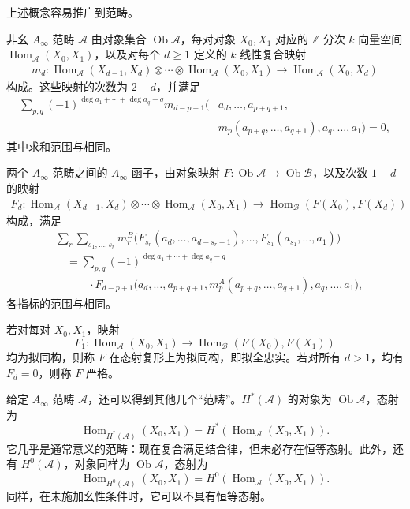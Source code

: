 上述概念容易推广到范畴。
\begin{definition}\label{def:8.6}
非幺 $A_\infty$ 范畴 $\mathcal A$ 由对象集合 $\operatorname{Ob}\mathcal A$，每对对象 $X_0,X_1$ 对应的 $\mathbb Z$ 分次 $k$ 向量空间 $\operatorname{Hom}_{\mathcal A}(X_0,X_1)$，以及对每个 $d\geq1$ 定义的 $k$ 线性复合映射
\[
\begin{aligned}
m_d\colon\operatorname{Hom}_{\mathcal A}(X_{d-1},X_d)
\otimes\cdots\otimes\operatorname{Hom}_{\mathcal A}(X_0,X_1)
\longrightarrow\operatorname{Hom}_{\mathcal A}(X_0,X_d)
\end{aligned}
\]
构成。这些映射的次数为 $2-d$，并满足
\[
\begin{aligned}
\sum_{p,q}(-1)^{\deg a_1+\cdots+\deg a_q-q}
m_{d-p+1}\bigl(&a_d,\ldots,a_{p+q+1},\\
&m_p(a_{p+q},\ldots,a_{q+1}),a_q,\ldots,a_1\bigr)=0,
\end{aligned}
\]
其中求和范围与相同。

两个 $A_\infty$ 范畴之间的 $A_\infty$ 函子，由对象映射 $F\colon\operatorname{Ob}\mathcal A\to\operatorname{Ob}\mathcal B$，以及次数 $1-d$ 的映射
\[
\begin{aligned}
F_d\colon\operatorname{Hom}_{\mathcal A}(X_{d-1},X_d)
\otimes\cdots\otimes\operatorname{Hom}_{\mathcal A}(X_0,X_1)
\longrightarrow\operatorname{Hom}_{\mathcal B}(F(X_0),F(X_d))
\end{aligned}
\]
构成，满足
\[
\begin{aligned}
&\sum_r\sum_{s_1,\ldots,s_r}
m_r^B\bigl(F_{s_r}(a_d,\ldots,a_{d-s_r+1}),\ldots,
F_{s_1}(a_{s_1},\ldots,a_1)\bigr)\\
&\quad=\sum_{p,q}(-1)^{\deg a_1+\cdots+\deg a_q-q}\\
&\qquad\quad\cdot F_{d-p+1}\bigl(a_d,\ldots,a_{p+q+1},
m_p^A(a_{p+q},\ldots,a_{q+1}),a_q,\ldots,a_1\bigr),
\end{aligned}
\]
各指标的范围与相同。

若对每对 $X_0,X_1$，映射
\[
F_1\colon\operatorname{Hom}_{\mathcal A}(X_0,X_1)
\longrightarrow\operatorname{Hom}_{\mathcal B}(F(X_0),F(X_1))
\]
均为拟同构，则称 $F$ 在态射复形上为拟同构，即拟全忠实。若对所有 $d>1$，均有 $F_d=0$，则称 $F$ 严格。
\end{definition}

给定 $A_\infty$ 范畴 $\mathcal A$，还可以得到其他几个“范畴”。$H^*(\mathcal A)$ 的对象为 $\operatorname{Ob}\mathcal A$，态射为
\[
\operatorname{Hom}_{H^*(\mathcal A)}(X_0,X_1)
=H^*(\operatorname{Hom}_{\mathcal A}(X_0,X_1)).
\]
它几乎是通常意义的范畴：现在复合满足结合律，但未必存在恒等态射。此外，还有 $H^0(\mathcal A)$，对象同样为 $\operatorname{Ob}\mathcal A$，态射为
\[
\operatorname{Hom}_{H^0(\mathcal A)}(X_0,X_1)
=H^0(\operatorname{Hom}_{\mathcal A}(X_0,X_1)).
\]
同样，在未施加幺性条件时，它可以不具有恒等态射。






